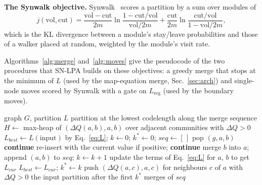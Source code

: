 \documentclass[conference]{IEEEtran}
\begin{document}
\textbf{The Synwalk objective.} Synwalk~\cite{toth2022} scores a partition by a sum over modules of
\begin{equation}
j(\mathrm{vol},\mathrm{cut})=\frac{\mathrm{vol}-\mathrm{cut}}{2m}\ln\frac{1-\mathrm{cut}/\mathrm{vol}}{\mathrm{vol}/2m}+\frac{\mathrm{cut}}{2m}\ln\frac{\mathrm{cut}/\mathrm{vol}}{1-\mathrm{vol}/2m},\label{eq:synwalk}
\end{equation}
which is the KL divergence between a module's stay/leave probabilities and those of a walker placed at random, weighted by the module's visit rate.

Algorithms~\ref{alg:merge} and~\ref{alg:moves} give the pseudocode of the two procedures that SN-LPA builds on these objectives: a greedy merge that stops at the minimum of $L$ (used by the map-equation merge, Sec.~\ref{sec:arch}) and single-node moves scored by Synwalk with a gate on $L_{\mathrm{reg}}$ (used by the boundary moves).

\begin{algorithm}[!t]
\footnotesize
\caption{\textsc{MapEqMerge}$(G,L)$: map-equation merge}\label{alg:merge}
\begin{algorithmic}[1]
\Require graph $G$, partition $L$
\Ensure partition at the lowest codelength along the merge sequence
\State $H\gets$ max-heap of $(\Delta Q(a,b),a,b)$ over adjacent communities with $\Delta Q>0$
\State $L_{best}\gets L(\text{input})$ by Eq.~\eqref{eq:L}; $k\gets0$; $k^{*}\gets0$; $seq\gets[\,]$
  \State pop $(g,a,b)$
   \textbf{continue} \EndIf
    \State re-insert with the current value if positive; \textbf{continue}
  \EndIf
  \State merge $b$ into $a$; append $(a,b)$ to $seq$; $k\gets k+1$
  \State update the terms of Eq.~\eqref{eq:L} for $a$, $b$ to get $L_{cur}$
    \State $L_{best}\gets L_{cur}$; $k^{*}\gets k$
  \EndIf
  \State push $(\Delta Q(a,c),a,c)$ for neighbours $c$ of $a$ with $\Delta Q>0$
\EndWhile
\State \Return the input partition after the first $k^{*}$ merges of $seq$
\end{algorithmic}
\end{algorithm}
\end{document}
